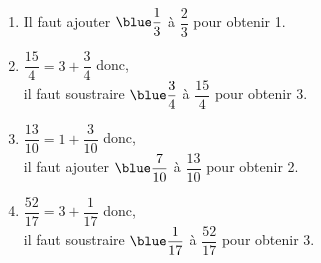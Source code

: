    \ \\ [-5mm]
   \begin{enumerate}
      \item Il faut ajouter $\blue \dfrac13$ à $\dfrac23$ pour obtenir 1. \bigskip
      \item $\dfrac{15}{4} =3+\dfrac34$ donc, \\ [1mm]
         il faut soustraire $\blue \dfrac34$ à $\dfrac{15}{4}$ pour obtenir 3. \bigskip
      \item $\dfrac{13}{10} =1+\dfrac{3}{10}$ donc, \\ [1mm]
         il faut ajouter $\blue \dfrac{7}{10}$ à $\dfrac{13}{10}$ pour obtenir 2. \bigskip
      \item $\dfrac{52}{17} =3+\dfrac{1}{17}$ donc, \\ [1mm]
         il faut soustraire $\blue \dfrac{1}{17}$ à $\dfrac{52}{17}$ pour obtenir 3. \bigskip
   \end{enumerate}
